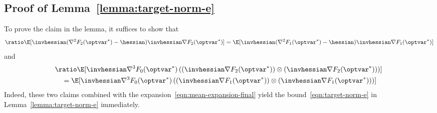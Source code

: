 \documentclass[11pt,twoside]{article}
\theoremstyle{definition}
\begin{document}

\subsection{Proof of Lemma~\ref{lemma:target-norm-e}}
\label{sec:proof-target-norm-e}

To prove the claim in the lemma, it suffices to show that
  \begin{equation}
    \label{eqn:second-order-cancellation-one}
    \ratio\E[\invhessian(\nabla^2 F_2(\optvar^*) - \hessian) \invhessian
      \nabla F_2(\optvar^*)]
    =
    \E[\invhessian(\nabla^2
      F_1(\optvar^*) - \hessian) \invhessian \nabla F_1(\optvar^*)]
  \end{equation}
  and
  \begin{align}
    \lefteqn{\ratio\E[\invhessian \nabla^3 F_0(\optvar^*)\left(
        (\invhessian \nabla F_2(\optvar^*)) \otimes (\invhessian \nabla
        F_2(\optvar^*)) \right)]} \nonumber \\
    & \quad =
    \E[\invhessian \nabla^3 F_0(\optvar^*)\left( (\invhessian
      \nabla F_1(\optvar^*)) \otimes (\invhessian \nabla F_1(\optvar^*))
      \right)]
    \label{eqn:second-order-cancellation-two}
  \end{align}
  Indeed, these two claims combined with the
  expansion~\eqref{eqn:mean-expansion-final} yield the
  bound~\eqref{eqn:target-norm-e} in Lemma~\ref{lemma:target-norm-e}
  immediately.
\end{document}
